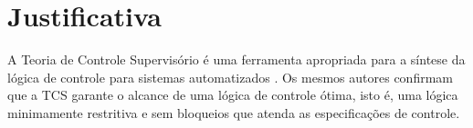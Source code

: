 





\section{Justificativa}


A Teoria de Controle Supervis\'orio \'e uma ferramenta apropriada para a s\'intese da l\'ogica de controle para sistemas automatizados \cite{leal2009}. Os mesmos autores confirmam que a TCS garante o alcance de uma l\'ogica de controle \'otima, isto \'e, uma l\'ogica minimamente restritiva e sem bloqueios que atenda as especifica\c{c}\~oes de controle.

